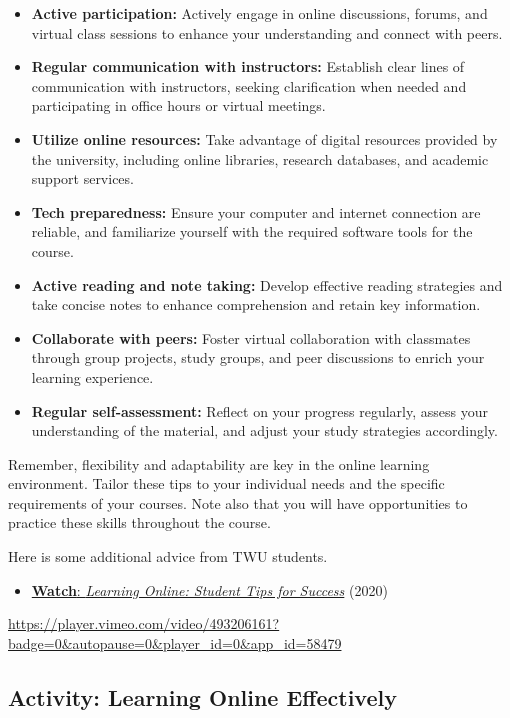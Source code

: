 \documentclass[
  letterpaper,
  DIV=11,
  numbers=noendperiod]{scrreprt}
\providecommand{\tightlist}{%
  \setlength{\itemsep}{0pt}\setlength{\parskip}{0pt}}\usepackage{longtable,booktabs,array}
\begin{document}
\begin{itemize}
\tightlist
\item
  \textbf{Active participation:} Actively engage in online discussions,
  forums, and virtual class sessions to enhance your understanding and
  connect with peers.
\item
  \textbf{Regular communication with instructors:} Establish clear lines
  of communication with instructors, seeking clarification when needed
  and participating in office hours or virtual meetings.
\item
  \textbf{Utilize online resources:} Take advantage of digital resources
  provided by the university, including online libraries, research
  databases, and academic support services.
\item
  \textbf{Tech preparedness:} Ensure your computer and internet
  connection are reliable, and familiarize yourself with the required
  software tools for the course.
\item
  \textbf{Active reading and note taking:} Develop effective reading
  strategies and take concise notes to enhance comprehension and retain
  key information.
\item
  \textbf{Collaborate with peers:} Foster virtual collaboration with
  classmates through group projects, study groups, and peer discussions
  to enrich your learning experience.
\item
  \textbf{Regular self-assessment:} Reflect on your progress regularly,
  assess your understanding of the material, and adjust your study
  strategies accordingly.
\end{itemize}

Remember, flexibility and adaptability are key in the online learning
environment. Tailor these tips to your individual needs and the specific
requirements of your courses. Note also that you will have opportunities
to practice these skills throughout the course.

Here is some additional advice from TWU students.

\begin{itemize}
\tightlist
\item
  \href{https://vimeo.com/493206161}{\textbf{Watch}: \emph{Learning
  Online: Student Tips for Success}} (2020)
\end{itemize}

\url{https://player.vimeo.com/video/493206161?badge=0&autopause=0&player_id=0&app_id=58479}

\subsection{Activity: Learning Online
Effectively}\label{activity-learning-online-effectively}
\end{document}

